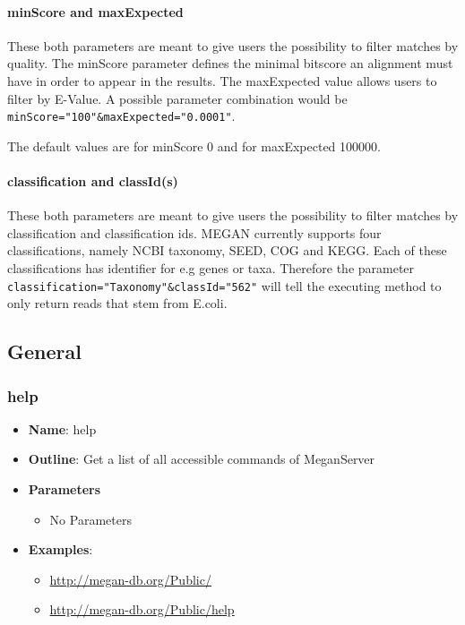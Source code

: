 \documentclass[11pt]{article}
\begin{document}
\paragraph{minScore and maxExpected}
\label{subsec:minScore}
These both parameters are meant to give users the possibility to filter matches by quality. The minScore parameter defines the minimal bitscore an alignment must have in order to appear in the results. The maxExpected value allows users to filter by E-Value. A possible parameter combination would be \texttt{minScore="100"\&maxExpected="0.0001"}.

The default values are for minScore 0 and for maxExpected 100000.


\paragraph{classification and classId(s)}
\label{subsec:class}
These both parameters are meant to give users the possibility to filter matches by classification and classification ids. MEGAN currently supports four classifications, namely NCBI taxonomy, SEED, COG and KEGG. Each of these classifications has identifier for e.g genes or taxa. Therefore the parameter \texttt{classification="Taxonomy"\&classId="562"} will tell the executing method to only return reads that stem from E.coli.



\subsection{General}
\subsubsection{help}

\begin{itemize}
	\item \textbf{Name}: help
	\item \textbf{Outline}: Get a list of all accessible commands of MeganServer
	\item \textbf{Parameters}
		\begin{itemize}
			\item No Parameters
		\end{itemize}
	\item \textbf{Examples}:
		\begin{itemize}
			\item \url{http://megan-db.org/Public/}
			\item \url{http://megan-db.org/Public/help}
		\end{itemize}
\end{itemize}
\end{document}
